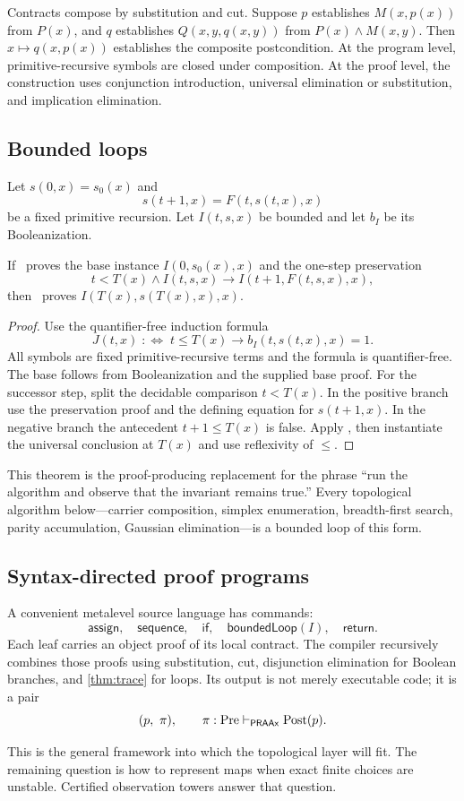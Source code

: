 Contracts compose by substitution and cut.  Suppose $p$ establishes $M(x,p(x))$ from $P(x)$, and $q$ establishes $Q(x,y,q(x,y))$ from $P(x)\wedge M(x,y)$.  Then $x\mapsto q(x,p(x))$ establishes the composite postcondition.  At the program level, primitive-recursive symbols are closed under composition.  At the proof level, the construction uses conjunction introduction, universal elimination or substitution, and implication elimination.

\subsection{Bounded loops}

Let $s(0,x)=s_{0}(x)$ and
\[
  s(t+1,x)=F(t,s(t,x),x)
\]
be a fixed primitive recursion.  Let $I(t,s,x)$ be bounded and let $b_I$ be its Booleanization.

\begin{theorem}
\label{thm:trace}
If \ipra\ proves the base instance $I(0,s_{0}(x),x)$ and the one-step preservation
\[
  t<T(x)\wedge I(t,s,x)
  \to
  I(t+1,F(t,s,x),x),
\]
then \ipra\ proves $I(T(x),s(T(x),x),x)$.
\end{theorem}

\begin{proof}
Use the quantifier-free induction formula
\[
  J(t,x)\;:\!\iff\;
  t\leq T(x)\to b_I(t,s(t,x),x)=1.
\]
All symbols are fixed primitive-recursive terms and the formula is quantifier-free.  The base follows from Booleanization and the supplied base proof.  For the successor step, split the decidable comparison $t<T(x)$.  In the positive branch use the preservation proof and the defining equation for $s(t+1,x)$.  In the negative branch the antecedent $t+1\leq T(x)$ is false.  Apply , then instantiate the universal conclusion at $T(x)$ and use reflexivity of $\leq$.
\end{proof}

This theorem is the proof-producing replacement for the phrase ``run the algorithm and observe that the invariant remains true.''  Every topological algorithm below---carrier composition, simplex enumeration, breadth-first search, parity accumulation, Gaussian elimination---is a bounded loop of this form.

\subsection{Syntax-directed proof programs}

A convenient metalevel source language has commands:
\[
  \mathsf{assign},\quad
  \mathsf{sequence},\quad
  \mathsf{if},\quad
  \mathsf{boundedLoop}(I),\quad
  \mathsf{return}.
\]
Each leaf carries an object proof of its local contract.  The compiler recursively combines those proofs using substitution, cut, disjunction elimination for Boolean branches, and \cref{thm:trace} for loops.  Its output is not merely executable code; it is a pair
\[
  (p,\ \pi),
  \qquad
  \pi: \operatorname{Pre}\vdash_{\PRAAx}\operatorname{Post}(p).
\]

This is the general framework into which the topological layer will fit.  The remaining question is how to represent maps when exact finite choices are unstable.  Certified observation towers answer that question.
